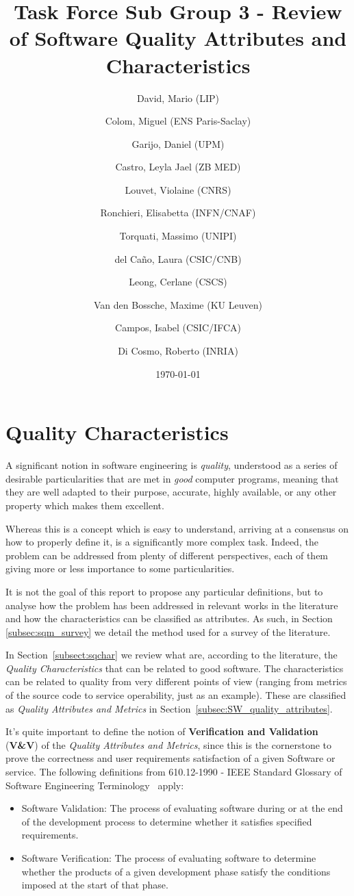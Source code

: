 \documentclass[a4paper]{article}
\title{Task Force Sub Group 3 - Review of Software Quality Attributes and Characteristics}
\author{
    David, Mario (LIP) \orcidlink{0000-0003-1802-5356} \and
    Colom, Miguel (ENS Paris-Saclay) \orcidlink{0000-0003-2636-0656} \and
    Garijo, Daniel (UPM) \orcidlink{0000-0003-0454-7145} \and
    Castro, Leyla Jael (ZB MED) \orcidlink{0000-0003-3986-0510} \and
    Louvet, Violaine (CNRS) \orcidlink{0000-0002-8742-8952} \and
    Ronchieri, Elisabetta (INFN/CNAF) \orcidlink{0000-0002-7341-6491} \and
    Torquati, Massimo (UNIPI) \orcidlink{0000-0001-6323-3459} \and
    del Ca\~{n}o, Laura (CSIC/CNB) \orcidlink{0000-0003-0981-2040} \and
    Leong, Cerlane (CSCS)  \orcidlink{0000-0001-8241-6277} \and
    Van den Bossche, Maxime (KU Leuven) \orcidlink{0000-0002-0938-0156} \and
    Campos, Isabel (CSIC/IFCA) \orcidlink{0000-0002-9350-0383} \and
    Di Cosmo, Roberto (INRIA) \orcidlink{0000-0002-7493-5349}
}
\date{\today}
\begin{document}
\maketitle
\tableofcontents

\newpage
\section{Quality Characteristics}

A significant notion in software engineering is \textit{quality}, understood as a series of desirable particularities that are met in \textit{good} computer programs, meaning that they are well adapted to their purpose, accurate, highly available, or any other property which makes them excellent.

Whereas this is a concept which is easy to understand, arriving at a consensus on how to properly define it, is a significantly more complex task. Indeed, the problem can be addressed from plenty of different perspectives, each of them giving more or less importance to some particularities.

It is not the goal of this report to propose any particular definitions, but to analyse how the problem has been addressed in relevant works in the literature and how the characteristics can be classified as attributes. As such, in Section \ref{subsec:sqm_survey} we detail the method used for a survey of the literature.

In Section~\ref{subsect:sqchar} we review what are, according to the literature, the \textit{Quality Characteristics} that can be related to good software. The characteristics can be related to quality from very different points of view (ranging from metrics of the source code to service operability, just as an example). These are classified as \textit{Quality Attributes and Metrics} in Section~\ref{subsec:SW_quality_attributes}.

It's quite important to define the notion of \textbf{Verification and Validation} (\textbf{V\&V}) of the \textit{Quality Attributes and Metrics}, since this is the cornerstone to prove the correctness and user requirements satisfaction of a given Software or service. The following definitions from 610.12-1990 - IEEE Standard Glossary of Software Engineering Terminology~\cite{ieee610} apply:

\begin{itemize}
    \item Software Validation: The process of evaluating software during or at the end of the development process to determine whether it satisfies specified requirements.
    \item Software Verification: The process of evaluating software to determine whether the products of a given development phase satisfy the conditions imposed at the start of that phase.
\end{itemize}
\end{document}
